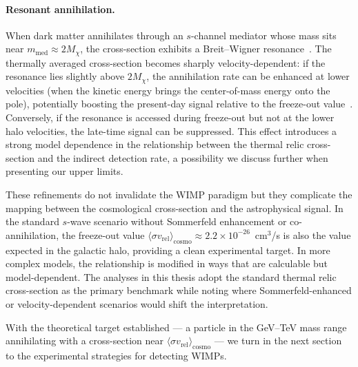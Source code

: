 \paragraph{Resonant annihilation.}
When dark matter annihilates through an $s$-channel mediator whose mass sits near $m_\mathrm{med} \approx 2 M_\chi$, the cross-section exhibits a Breit--Wigner resonance~\cite{Griest:1990kh,Gondolo:1990dk}.
The thermally averaged cross-section becomes sharply velocity-dependent: if the resonance lies slightly above $2M_\chi$, the annihilation rate can be enhanced at lower velocities (when the kinetic energy brings the center-of-mass energy onto the pole), potentially boosting the present-day signal relative to the freeze-out value~\cite{Cirelli:2024ssz}.
Conversely, if the resonance is accessed during freeze-out but not at the lower halo velocities, the late-time signal can be suppressed.
This effect introduces a strong model dependence in the relationship between the thermal relic cross-section and the indirect detection rate, a possibility we discuss further when presenting our upper limits.

These refinements do not invalidate the WIMP paradigm but they complicate the mapping between the cosmological cross-section and the astrophysical signal.
In the standard $s$-wave scenario without Sommerfeld enhancement or co-annihilation, the freeze-out value $\langle \sigma v_\mathrm{rel} \rangle_\mathrm{cosmo} \approx 2.2 \times 10^{-26}$~cm$^3$/s is also the value expected in the galactic halo, providing a clean experimental target.
In more complex models, the relationship is modified in ways that are calculable but model-dependent.
The analyses in this thesis adopt the standard thermal relic cross-section as the primary benchmark while noting where Sommerfeld-enhanced or velocity-dependent scenarios would shift the interpretation.

With the theoretical target established --- a particle in the GeV--TeV mass range annihilating with a cross-section near $\langle \sigma v_\mathrm{rel} \rangle_\mathrm{cosmo}$ --- we turn in the next section to the experimental strategies for detecting WIMPs.
